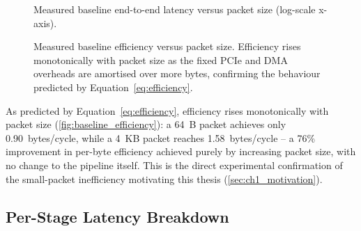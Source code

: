 \begin{figure}[htbp]
\centering
{}
\caption{Measured baseline end-to-end latency versus packet size (log-scale x-axis).}
\label{fig:baseline_latency}
\end{figure}

\begin{figure}[htbp]
\centering
{}
\caption{Measured baseline efficiency versus packet size. Efficiency rises monotonically with packet size as the fixed PCIe and DMA overheads are amortised over more bytes, confirming the behaviour predicted by Equation~\ref{eq:efficiency}.}
\label{fig:baseline_efficiency}
\end{figure}

As predicted by Equation~\ref{eq:efficiency}, efficiency rises monotonically with packet size (\autoref{fig:baseline_efficiency}): a 64~B packet achieves only 0.90~bytes/cycle, while a 4~KB packet reaches 1.58~bytes/cycle -- a 76\% improvement in per-byte efficiency achieved purely by increasing packet size, with no change to the pipeline itself. This is the direct experimental confirmation of the small-packet inefficiency motivating this thesis (\autoref{sec:ch1_motivation}).

\subsection{Per-Stage Latency Breakdown}
\label{sec:ch7_breakdown}

